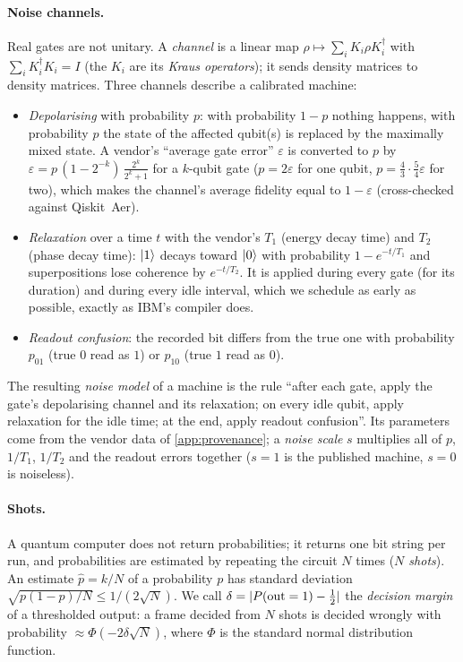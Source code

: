 \paragraph{Noise channels.}
Real gates are not unitary.  A \emph{channel} is a linear map $\rho\mapsto\sum_i K_i\rho K_i^\dagger$
with $\sum_i K_i^\dagger K_i = I$ (the $K_i$ are its \emph{Kraus operators}); it sends density
matrices to density matrices.  Three channels describe a calibrated machine:
\begin{itemize}[nosep]
\item \emph{Depolarising} with probability $p$: with probability $1-p$ nothing happens, with
probability $p$ the state of the affected qubit(s) is replaced by the maximally mixed state.  A
vendor's ``average gate error'' $\varepsilon$ is converted to $p$ by
$\varepsilon = p\,(1 - 2^{-k})\,\tfrac{2^k}{2^k+1}$ for a $k$-qubit gate ($p = 2\varepsilon$ for
one qubit, $p = \tfrac{4}{3}\cdot\tfrac{5}{4}\varepsilon$ for two), which makes the channel's
average fidelity equal to $1-\varepsilon$ (cross-checked against Qiskit~Aer).
\item \emph{Relaxation} over a time $t$ with the vendor's $T_1$ (energy decay time) and $T_2$
(phase decay time): $\lvert 1 \rangle$ decays toward $\lvert 0 \rangle$ with probability $1-e^{-t/T_1}$ and
superpositions lose coherence by $e^{-t/T_2}$.  It is applied during every gate (for its
duration) and during every idle interval, which we schedule as early as possible, exactly as
IBM's compiler does.
\item \emph{Readout confusion}: the recorded bit differs from the true one with probability
$p_{01}$ (true $0$ read as $1$) or $p_{10}$ (true $1$ read as $0$).
\end{itemize}
The resulting \emph{noise model} of a machine is the rule ``after each gate, apply the gate's
depolarising channel and its relaxation; on every idle qubit, apply relaxation for the idle time;
at the end, apply readout confusion''.  Its parameters come from the vendor data of
\cref{app:provenance}; a \emph{noise scale} $s$ multiplies all of $p$, $1/T_1$, $1/T_2$ and the
readout errors together ($s=1$ is the published machine, $s=0$ is noiseless).

\paragraph{Shots.}
A quantum computer does not return probabilities; it returns one bit string per run, and
probabilities are estimated by repeating the circuit $N$ times (\emph{$N$ shots}).  An estimate
$\hat p = k/N$ of a probability $p$ has standard deviation $\sqrt{p(1-p)/N}\le 1/(2\sqrt N)$.  We
call $\delta = |P(\mathrm{out}=1) - \tfrac12|$ the \emph{decision margin} of a thresholded output: a frame
decided from $N$ shots is decided wrongly with probability $\approx\Phi(-2\delta\sqrt N)$, where
$\Phi$ is the standard normal distribution function.

